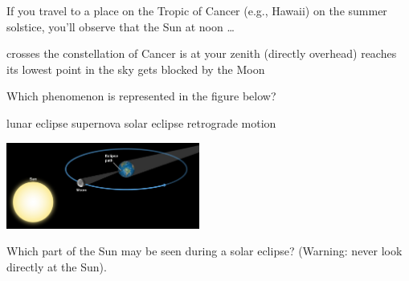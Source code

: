 \documentclass[addpoints]{exam}
\begin{document}
\begin{questions}
\question
If you travel to a place on the Tropic of Cancer (e.g., Hawaii) on the summer solstice, you'll observe that the Sun at noon \ldots

\begin{choices}
    \choice crosses the constellation of Cancer
    \correctchoice is at your zenith (directly overhead)
    \choice reaches its lowest point in the sky
    \choice gets blocked by the Moon
\end{choices}





\question
Which phenomenon is represented in the figure below?
\vspace{1em}

\begin{minipage}{0.45\textwidth}
    \centering
    \begin{choices}
    \choice lunar eclipse
    \choice supernova
    \correctchoice solar eclipse
    \choice retrograde motion
    \end{choices}
\end{minipage}%
\begin{minipage}{0.5\textwidth}
    \centering
    \includegraphics[width=2.5in]{Figures/Figure4.22.jpg}
\end{minipage}
\vspace{1em}

\question
Which part of the Sun may be seen during a solar eclipse? (Warning: never look directly at the Sun).


\end{questions}
\end{document}
